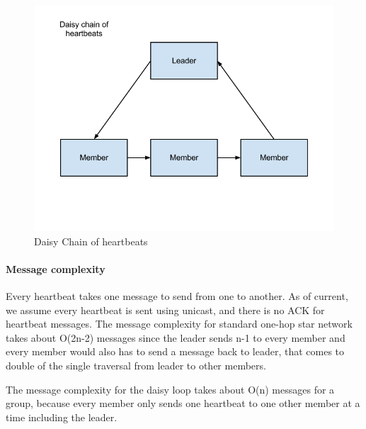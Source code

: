 \begin{figure}[h!]
\label{daisy_chain}
\caption{Daisy Chain of heartbeats}
\centering
    \includegraphics[width=\linewidth]{figures/daisy-chain}
\end{figure}



\paragraph{Message complexity}

Every heartbeat takes one message to send from one to another. As of current,
      we assume every heartbeat is sent using unicast, and there is no ACK for
      heartbeat messages. The message complexity for standard one-hop star
      network takes about
      O(2n-2) messages since the leader sends n-1 to every member and every
      member would also has to send a message back to leader, that comes to
      double of the single traversal from leader to other members.

The message complexity for the daisy loop takes about O(n) messages for a group, because every member only sends one heartbeat to one other member at a time including the leader.

